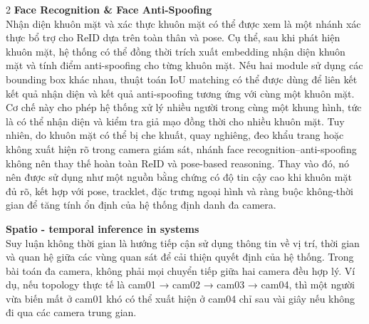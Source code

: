 \documentclass[a4paper, twoside, 12pt]{article}
\begin{document}
\begin{multicols}{2}
\textbf{Face Recognition \& Face Anti-Spoofing}\\
Nhận diện khuôn mặt và xác thực khuôn mặt có thể được xem là một nhánh xác thực bổ trợ cho ReID dựa trên toàn thân và pose. Cụ thể, sau khi phát hiện khuôn mặt, hệ thống có thể đồng thời trích xuất embedding nhận diện khuôn mặt và tính điểm anti-spoofing cho từng khuôn mặt. Nếu hai module sử dụng các bounding box khác nhau, thuật toán IoU matching có thể được dùng để liên kết kết quả nhận diện và kết quả anti-spoofing tương ứng với cùng một khuôn mặt. Cơ chế này cho phép hệ thống xử lý nhiều người trong cùng một khung hình, tức là có thể nhận diện và kiểm tra giả mạo đồng thời cho nhiều khuôn mặt. Tuy nhiên, do khuôn mặt có thể bị che khuất, quay nghiêng, đeo khẩu trang hoặc không xuất hiện rõ trong camera giám sát, nhánh face recognition--anti-spoofing không nên thay thế hoàn toàn ReID và pose-based reasoning. Thay vào đó, nó nên được sử dụng như một nguồn bằng chứng có độ tin cậy cao khi khuôn mặt đủ rõ, kết hợp với pose, tracklet, đặc trưng ngoại hình và ràng buộc không-thời gian để tăng tính ổn định của hệ thống định danh đa camera.

\textbf{Spatio - temporal inference in systems}\\
Suy luận không thời gian là hướng tiếp cận sử dụng thông tin về vị trí, thời gian và quan hệ giữa các vùng quan sát để cải thiện quyết định của hệ thống. Trong bài toán đa camera, không phải mọi chuyển tiếp giữa hai camera đều hợp lý. Ví dụ, nếu topology thực tế là cam01 → cam02 → cam03 → cam04, thì một người vừa biến mất ở cam01 khó có thể xuất hiện ở cam04 chỉ sau vài giây nếu không đi qua các camera trung gian.
\end{multicols}


\vspace{0.2cm}
\end{document}
